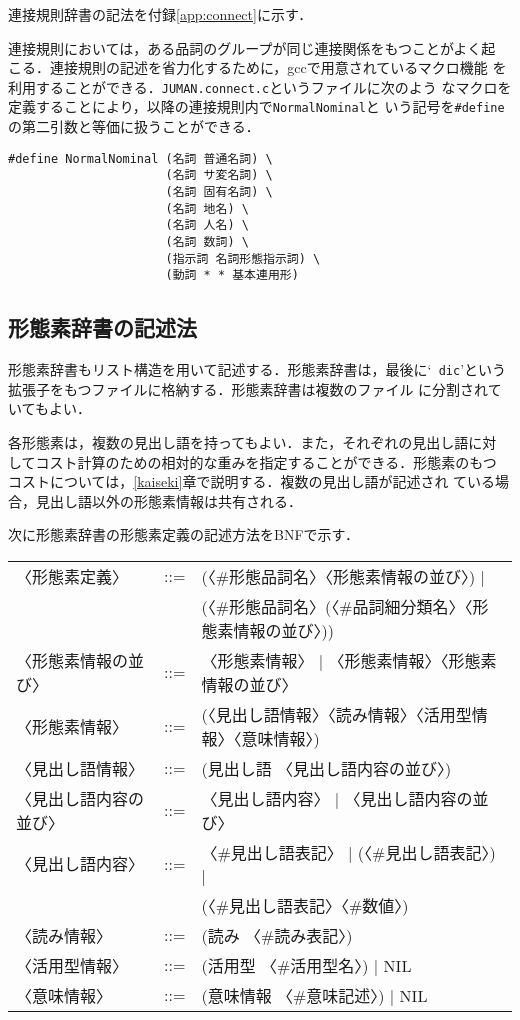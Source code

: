 \documentclass[a4j,titlepage]{jarticle}
\begin{document}
\begin{enumerate}
連接規則辞書の記法を付録\ref{app:connect}に示す．

連接規則においては，ある品詞のグループが同じ連接関係をもつことがよく起
こる．連接規則の記述を省力化するために，gccで用意されているマクロ機能
を利用することができる．{\tt JUMAN.connect.c}というファイルに次のよう
なマクロを定義することにより，以降の連接規則内で{\tt NormalNominal}と
いう記号を{\tt \#define}の第二引数と等価に扱うことができる．

\begin{verbatim}
#define NormalNominal (名詞 普通名詞) \
                      (名詞 サ変名詞) \
                      (名詞 固有名詞) \
                      (名詞 地名) \
                      (名詞 人名) \
                      (名詞 数詞) \
                      (指示詞 名詞形態指示詞) \
                      (動詞 * * 基本連用形)
\end{verbatim}

\end{enumerate}

\subsection{形態素辞書の記述法}
\label{ss:jds-md}

形態素辞書もリスト構造を用いて記述する．形態素辞書は，最後に`{\tt
dic}'という拡張子をもつファイルに格納する．形態素辞書は複数のファイル
に分割されていてもよい．

各形態素は，複数の見出し語を持ってもよい．また，それぞれの見出し語に対
してコスト計算のための相対的な重みを指定することができる．形態素のもつ
コストについては，\ref{kaiseki}章で説明する．複数の見出し語が記述され
ている場合，見出し語以外の形態素情報は共有される．

次に形態素辞書の形態素定義の記述方法をBNFで示す．

\begin{tt}
\begin{tabular}{lll}
〈形態素定義〉  &::=&(〈\#形態品詞名〉〈形態素情報の並び〉) |                \\
                &   &(〈\#形態品詞名〉(〈\#品詞細分類名〉〈形態素情報の並び〉))\\
〈形態素情報の並び〉&::=&〈形態素情報〉 | 〈形態素情報〉〈形態素情報の並び〉\\
〈形態素情報〉  &::=& (〈見出し語情報〉〈読み情報〉〈活用型情報〉〈意味情報〉)\\
〈見出し語情報〉&::=& (見出し語 〈見出し語内容の並び〉) \\
〈見出し語内容の並び〉&::=&〈見出し語内容〉 | 〈見出し語内容の並び〉\\
〈見出し語内容〉&::=& 〈\#見出し語表記〉 | (〈\#見出し語表記〉)  | \\
                &   &  (〈\#見出し語表記〉〈\#数値〉) \\
〈読み情報〉    &::=& (読み 〈\#読み表記〉) \\
〈活用型情報〉  &::=& (活用型 〈\#活用型名〉) | NIL \\
〈意味情報〉    &::=& (意味情報 〈\#意味記述〉) | NIL
\end{tabular}
\end{tt}
\end{document}
